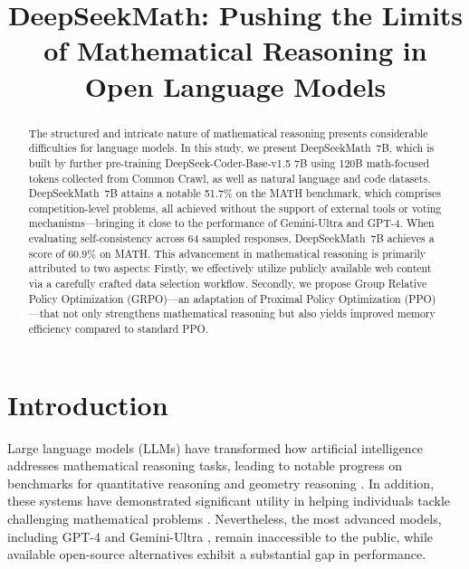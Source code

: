 \title{DeepSeekMath: Pushing the Limits of Mathematical Reasoning in Open Language Models}

\begin{abstract}
The structured and intricate nature of mathematical reasoning presents considerable difficulties for language models. In this study, we present DeepSeekMath~7B, which is built by further pre-training DeepSeek-Coder-Base-v1.5 7B using 120B math-focused tokens collected from Common Crawl, as well as natural language and code datasets. DeepSeekMath~7B attains a notable 51.7\% on the MATH benchmark, which comprises competition-level problems, all achieved without the support of external tools or voting mechanisms—bringing it close to the performance of Gemini-Ultra and GPT-4. When evaluating self-consistency across 64 sampled responses, DeepSeekMath~7B achieves a score of 60.9\% on MATH. This advancement in mathematical reasoning is primarily attributed to two aspects: Firstly, we effectively utilize publicly available web content via a carefully crafted data selection workflow. Secondly, we propose Group Relative Policy Optimization (GRPO)—an adaptation of Proximal Policy Optimization (PPO)—that not only strengthens mathematical reasoning but also yields improved memory efficiency compared to standard PPO.
\end{abstract}

\section{Introduction}

Large language models (LLMs) have transformed how artificial intelligence addresses mathematical reasoning tasks, leading to notable progress on benchmarks for quantitative reasoning \citep{MATH} and geometry reasoning \citep{trinh2024solving}. In addition, these systems have demonstrated significant utility in helping individuals tackle challenging mathematical problems \citep{tao}. Nevertheless, the most advanced models, including GPT-4 \citep{gpt4} and Gemini-Ultra \citep{gemini}, remain inaccessible to the public, while available open-source alternatives exhibit a substantial gap in performance.

